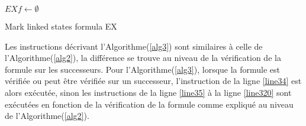 \begin{algorithm}[H]
\SetAlgoLined
{}
$EXf \longleftarrow \emptyset$\; \label{line31}
 \caption{Mark linked states formula EX}\label{alg3}
\end{algorithm}

Les instructions décrivant l'Algorithme(\ref{alg3}) sont similaires à celle de l'Algorithme(\ref{alg2}), la différence se trouve au niveau de la vérification de la formule sur les successeurs. Pour l'Algorithme(\ref{alg3}), lorsque la formule est vérifiée ou peut être vérifiée sur un successeur, l'instruction de la ligne \ref{line34} est alors exécutée, sinon les instructions de la ligne \ref{line35} à la ligne \ref{line320} sont exécutées en fonction de la vérification de la formule comme expliqué au niveau de  l'Algorithme(\ref{alg2}).

